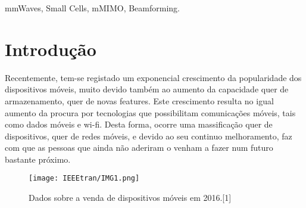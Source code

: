 \documentclass[conference]{IEEEtran}
\begin{document}
\begin{IEEEkeywords}
mmWaves, Small Cells, mMIMO, Beamforming.
\end{IEEEkeywords}





%
\IEEEpeerreviewmaketitle



\section{Introdução}
Recentemente, tem-se registado um exponencial crescimento da popularidade dos dispositivos móveis, muito devido também ao aumento da capacidade quer de armazenamento, quer de novas features. Este crescimento resulta no igual aumento da procura por tecnologias que possibilitam comunicações móveis, tais como dados móveis e wi-fi. Desta forma, ocorre uma massificação quer de dispositivos, quer de redes móveis, e devido ao seu continuo melhoramento, faz com que as pessoas que ainda não aderiram o venham a fazer num futuro bastante próximo.

\begin{figure}
\centering
\texttt{[image: IEEEtran/IMG1.png]}
\caption{Dados sobre a venda de dispositivos móveis em 2016.[1]}
\end{figure}
\end{document}
